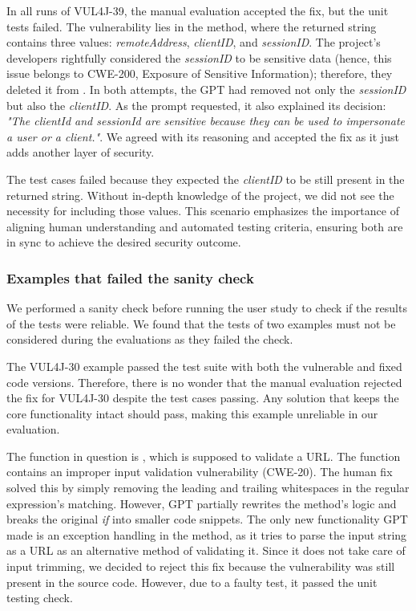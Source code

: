 In all runs of VUL4J-39, the manual evaluation accepted the fix, but the unit tests failed.
The vulnerability lies in the  method, where the returned string contains three values: \textit{remoteAddress}, \textit{clientID}, and \textit{sessionID}.
The project's developers rightfully considered the \textit{sessionID} to be sensitive data (hence, this issue belongs to CWE-200, Exposure of Sensitive Information); therefore, they deleted it from .
In both attempts, the GPT had removed not only the \textit{sessionID} but also the \textit{clientID}.
As the prompt requested, it also explained its decision: \textit{"The clientId and sessionId are sensitive because they can be used to impersonate a user or a client."}.
We agreed with its reasoning and accepted the fix as it just adds another layer of security.

The test cases failed because they expected the \textit{clientID} to be still present in the returned string.
Without in-depth knowledge of the project, we did not see the necessity for including those values.
This scenario emphasizes the importance of aligning human understanding and automated testing criteria, ensuring both are in sync to achieve the desired security outcome.

\subsubsection{Examples that failed the sanity check}
\label{sec:discussion:misfortunedataset}
We performed a sanity check before running the user study to check if the results of the tests were reliable.
We found that the tests of two examples must not be considered during the evaluations as they failed the check.

The VUL4J-30 example passed the test suite with both the vulnerable and fixed code versions.
Therefore, there is no wonder that the manual evaluation rejected the fix for VUL4J-30 despite the test cases passing.
Any solution that keeps the core functionality intact should pass, making this example unreliable in our evaluation.

The function in question is , which is supposed to validate a URL.
The function contains an improper input validation vulnerability (CWE-20).
The human fix solved this by simply removing the leading and trailing whitespaces in the regular expression's matching.
%
However, GPT partially rewrites the method's logic and breaks the original \textit{if} into smaller code snippets.
The only new functionality GPT made is an exception handling in the method, as it tries to parse the input string as a URL as an alternative method of validating it.
Since it does not take care of input trimming, we decided to reject this fix because the vulnerability was still present in the source code.
However, due to a faulty test, it passed the unit testing check.


